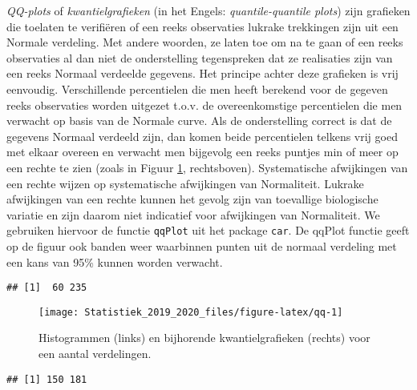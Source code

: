 \documentclass[12pt,dutch,coursenotes]{book}
\theoremstyle{definition}
\theoremstyle{definition}
\theoremstyle{definition}
\theoremstyle{remark}
\begin{document}
\emph{QQ-plots} of \emph{kwantielgrafieken} (in het Engels:
\emph{quantile-quantile plots}) zijn grafieken die toelaten te
verifiëren of een reeks observaties lukrake trekkingen zijn uit een
Normale verdeling. Met andere woorden, ze laten toe om na te gaan of een
reeks observaties al dan niet de onderstelling tegenspreken dat ze
realisaties zijn van een reeks Normaal verdeelde gegevens. Het principe
achter deze grafieken is vrij eenvoudig. Verschillende percentielen die
men heeft berekend voor de gegeven reeks observaties worden uitgezet
t.o.v. de overeenkomstige percentielen die men verwacht op basis van de
Normale curve. Als de onderstelling correct is dat de gegevens Normaal
verdeeld zijn, dan komen beide percentielen telkens vrij goed met elkaar
overeen en verwacht men bijgevolg een reeks puntjes min of meer op een
rechte te zien (zoals in Figuur \ref{fig:qq}, rechtsboven).
Systematische afwijkingen van een rechte wijzen op systematische
afwijkingen van Normaliteit. Lukrake afwijkingen van een rechte kunnen
het gevolg zijn van toevallige biologische variatie en zijn daarom niet
indicatief voor afwijkingen van Normaliteit. We gebruiken hiervoor de
functie \texttt{qqPlot} uit het package \texttt{car}. De qqPlot functie
geeft op de figuur ook banden weer waarbinnen punten uit de normaal
verdeling met een kans van 95\% kunnen worden verwacht.

\begin{verbatim}
## [1]  60 235
\end{verbatim}

\begin{figure}

{\centering \texttt{[image: Statistiek\_2019\_2020\_files/figure-latex/qq-1]} 

}

\caption{Histogrammen (links) en bijhorende kwantielgrafieken (rechts) voor een aantal verdelingen.}\label{fig:qq}
\end{figure}

\begin{verbatim}
## [1] 150 181
\end{verbatim}
\end{document}
